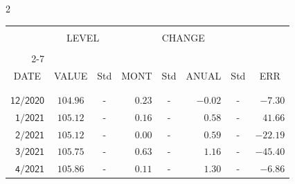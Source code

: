 \begin{multicols}{2}{ 
\begin{tabular}{rccrcrcr} 
\hline 
 \multicolumn{1}{|c|}{}  &  \multicolumn{2}{c|}{} & 
\multicolumn{4}{c}{} & \multicolumn{1}{|c|}{}\vspace{-.10in}\\ 
\multicolumn{1}{|c|}{}  &  \multicolumn{2}{c|}{LEVEL} & 
\multicolumn{4}{c}{CHANGE} & \multicolumn{1}{|c|}{}    \\  
\multicolumn{1}{|c|}{}  &  \multicolumn{2}{c|}{} & 
\multicolumn{4}{c}{} & \multicolumn{1}{|c|}{}\vspace{-.10in}\\ \cline{2-7} 
\multicolumn{1}{|c|}{ } &\multicolumn{1}{c|}{ } & \multicolumn{1}{c|}{} & \multicolumn{1}{c|}{} & \multicolumn{1}{c|}{}     & \multicolumn{1}{c|}{} & \multicolumn{1}{c|}{}  & \multicolumn{1}{c|}{}  \vspace{-.05in}\\  
\multicolumn{1}{|c|}{DATE } &\multicolumn{1}{c|}{ VALUE} & \multicolumn{1}{c|}{Std} & \multicolumn{1}{c|}{MONT} & \multicolumn{1}{c|}{Std}     & \multicolumn{1}{c|}{ANUAL} & \multicolumn{1}{c|}{Std}  & \multicolumn{1}{c|}{ERR}\\  
\multicolumn{1}{|c|}{ }      & \multicolumn{1}{c|}{  }    & \multicolumn{1}{c|}{ }&  \multicolumn{1}{c|}{   }  & \multicolumn{1}{c|}{ } & \multicolumn{1}{c|}{  }     & \multicolumn{1}{c|}{   }  &  \multicolumn{1}{c|}{   } \\  
 \hline 
 \\$\mathsf{      12/2020}$ &$\mathsf{   104.96}$ &     - &$\mathsf{    0.23}$ &     - &$\mathsf{    -0.02 }$ &     - &$\mathsf{  -7.30} $ \vspace{-.005in}\\ 
$\mathsf{       1/2021}$ &$\mathsf{   105.12}$ &     - &$\mathsf{    0.16}$ &     - &$\mathsf{     0.58 }$ &     - &$\mathsf{  41.66} $ \vspace{-.005in}\\ 
$\mathsf{       2/2021}$ &$\mathsf{   105.12}$ &     - &$\mathsf{    0.00}$ &     - &$\mathsf{     0.59 }$ &     - &$\mathsf{ -22.19} $ \vspace{-.005in}\\ 
$\mathsf{       3/2021}$ &$\mathsf{   105.75}$ &     - &$\mathsf{    0.63}$ &     - &$\mathsf{     1.16 }$ &     - &$\mathsf{ -45.40} $ \vspace{-.005in}\\ 
$\mathsf{       4/2021}$ &$\mathsf{   105.86}$ &     - &$\mathsf{    0.11}$ &     - &$\mathsf{     1.30 }$ &     - &$\mathsf{  -6.86} $ \vspace{-.005in}\\ 

\end{tabular}}
\end{multicols}
